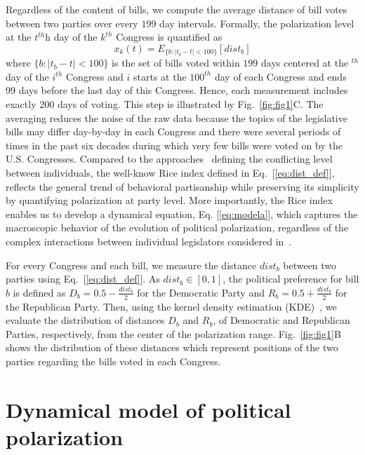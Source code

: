 Regardless of the content of bills, we compute the average distance of bill votes between two parties over every $199$ day intervals. Formally, the polarization level at the $t^{th}$h day of the $k^{th}$ Congress is quantified as
\begin{equation} \label{eq:average_level}
x_k(t) =  { {E}}_{\{ {b: |t_b-t|<100 }\}} \left[ \textit{dist}_b \right]
\end{equation}
where $\{b: |t_b-t|<100 \}$ is the set of bills voted within $199$ days centered at the $^{th}$ day of the $i^{th}$ Congress and $i$ starts at the $100^{th}$ day of each Congress and ends 99 days before the last day of this Congress. Hence, each measurement includes exactly 200 days of voting. This step is illustrated by Fig.~\ref{fig:fig1}C. The averaging reduces the noise of the raw data because the topics of the legislative bills may differ day-by-day in each Congress and there were several periods of times in the past six decades during which very few bills were voted on by the U.S. Congresses. Compared to the approaches~\cite{baldassarri2007dynamics, moody2013portrait, gu2017co} defining the conflicting level between individuals, the well-know Rice index defined in Eq.~[\ref{eq:dist_def}], reflects the general trend of behavioral partisanship while preserving its simplicity by quantifying polarization at party level. More importantly, the Rice index enables us to develop a dynamical equation, Eq. [\ref{eq:modela}], which captures the macroscopic behavior of the evolution of political polarization, regardless of the complex interactions between individual legislators considered in~\cite{moody2013portrait}.

For every Congress and each bill, we measure the distance $\textit{dist}_{b}$ between two parties using Eq.~[\ref{eq:dist_def}]. As $\textit{dist}_b\in[0,1]$, the political preference for bill $b$ is defined as $D_b = 0.5-\frac{\textit{dist}_{b}}{2}$ for the Democratic Party and $R_b = 0.5+\frac{\textit{dist}_{b}}{2}$ for the Republican Party. Then, using the kernel density estimation (KDE)~\cite{lauter1988silverman}, we evaluate the distribution of distances $D_{b}$ and $R_{b}$, of Democratic and Republican Parties, respectively, from the center of the polarization range. Fig.~\ref{fig:fig1}B shows the distribution of these distances which represent positions of the two parties regarding the bills voted in each Congress. 

\section{Dynamical model of political polarization} \label{sec:4.2}

